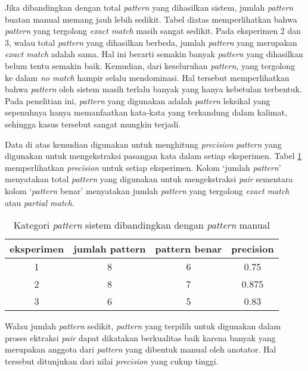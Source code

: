 Jika dibandingkan dengan total \textit{pattern} yang dihasilkan sistem, jumlah \textit{pattern} buatan manual memang jauh lebih sedikit. Tabel diatas memperlihatkan bahwa \textit{pattern} yang tergolong \textit{exact match} masih sangat sedikit. Pada eksperimen 2 dan 3, walau total \textit{pattern} yang dihasilkan berbeda, jumlah \textit{pattern} yang merupakan \textit{exact match} adalah sama. Hal ini berarti semakin banyak \textit{pattern} yang dihasilkan belum tentu semakin baik. Kemudian, dari keseluruhan \textit{pattern}, yang tergolong ke dalam \textit{no match} hampir selalu mendominasi. Hal tersebut memperlihatkan bahwa  \textit{pattern} oleh sistem masih terlalu banyak yang hanya kebetulan terbentuk. Pada penelitian ini, \textit{pattern} yang digunakan adalah \textit{pattern} leksikal yang sepenuhnya hanya memanfaatkan kata-kata yang terkandung dalam kalimat, sehingga kasus tersebut sangat mungkin terjadi.

Data di atas kemudian digunakan untuk menghitung \textit{precision} \textit{pattern} yang digunakan untuk mengekstraksi pasangan kata dalam setiap eksperimen. Tabel \ref{table:preceks} memperlihatkan \textit{precision} untuk setiap eksperimen. Kolom `jumlah \textit{pattern}' menyatakan total \textit{pattern} yang digunakan untuk mengekstraksi \textit{pair} sementara kolom `\textit{pattern} benar' menyatakan jumlah \textit{pattern} yang tergolong \textit{exact match} atau \textit{partial match}. 

\begin{table}
  \centering
  \caption{Kategori \textit{pattern} sistem dibandingkan dengan \textit{pattern} manual}
  \label{table:preceks}
  \begin{tabular}{|c|c|c|c|} 
  \hline
  eksperimen & jumlah pattern & pattern benar & precision \\ \hline
  1 & 8 & 6 & 0.75 \\ \hline
  2 & 8 & 7 & 0.875 \\ \hline
  3 & 6 & 5 & 0.83 \\ \hline
  \end{tabular} 
\end{table}

Walau jumlah \textit{pattern} sedikit, \textit{pattern} yang terpilih untuk digunakan dalam proses ektraksi \textit{pair} dapat dikatakan berkualitas baik karena banyak yang merupakan anggota dari \textit{pattern} yang dibentuk manual oleh anotator. Hal tersebut ditunjukan dari nilai \textit{precision} yang cukup tinggi.

